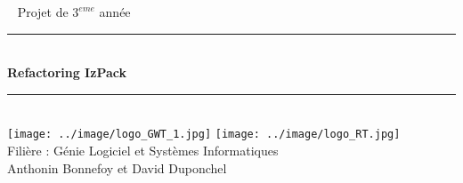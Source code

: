 \begin{frame}[plain]
\begin{center}
~
\vfill
\Large Projet de $3^{eme}$ année\\[1cm]
\hrule
~\\[0.4cm]
{ \Huge \bfseries Refactoring IzPack}\\[0.4cm]
\hrule
~\\[0.4cm]
\texttt{[image: ../image/logo\_GWT\_1.jpg]}
\hfil
\texttt{[image: ../image/logo\_RT.jpg]}
\\[0.4cm]
\Large Filière : Génie Logiciel et Systèmes Informatiques\\
\Large Anthonin Bonnefoy et David Duponchel
\vfill
\end{center}
\end{frame}